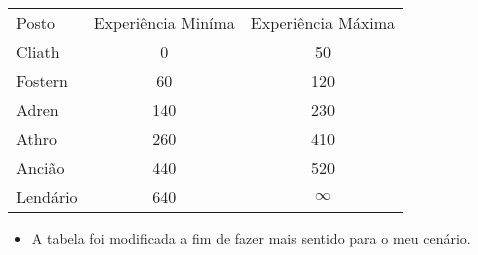 \begin{table}[!htpb]
\centering
\label{XP_posto_alto}
\begin{tabular}{|l c c|}
\hline
Posto       &	Experiência Miníma	& Experiência Máxima	\\

\rowcolor[HTML]{EFEFEF} 
Cliath		& 	0					& 50					\\

Fostern		& 	60					& 120					\\

\rowcolor[HTML]{EFEFEF} 
Adren		&	140					& 230					\\

Athro		&	260					& 410					\\

\rowcolor[HTML]{EFEFEF} 
Ancião		&	440					& 520					\\

Lendário	&	640					& $\infty$				\\
\hline
\end{tabular}
\end{table}

\begin{itemize}[noitemsep]
\item A tabela foi modificada a fim de fazer mais sentido para o meu cenário.
\end{itemize}
